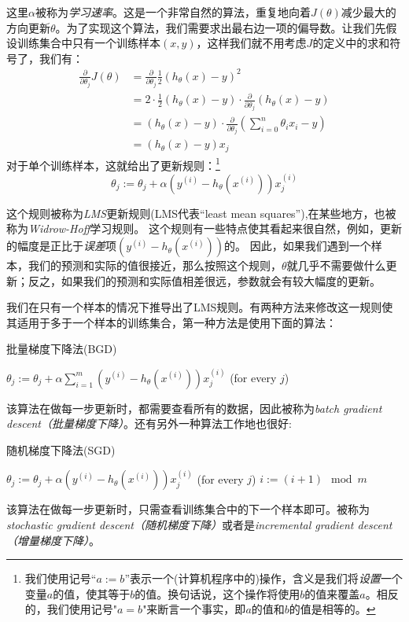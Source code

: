 这里$\alpha$被称为\emph{学习速率}。这是一个非常自然的算法，重复地向着$J(\theta)$减少最大的方向更新$\theta$。为了实现这个算法，我们需要求出最右边一项的偏导数。让我们先假设训练集合中只有一个训练样本$(x, y)$，这样我们就不用考虑$J$的定义中的求和符号了，我们有：
\begin{equation}
\begin{split}
\frac{\partial}{\partial\theta_j}J(\theta) &= \frac{\partial}{\partial\theta_j}\frac{1}{2}(h_\theta(x) - y)^2 \\
&= 2\cdot\frac{1}{2}(h_\theta(x) - y)\cdot\frac{\partial}{\partial\theta_j}(h_\theta(x) - y) \\
&= (h_\theta(x) - y)\cdot\frac{\partial}{\partial\theta_j}(\sum_{i = 0}^n\theta_ix_i - y) \\
&= (h_\theta(x) - y)x_j
\end{split}
\end{equation}
对于单个训练样本，这就给出了更新规则：\footnote{我们使用记号“$a := b$”表示一个(计算机程序中的)操作，含义是我们将\emph{设置}一个变量$a$的值，使其等于$b$的值。换句话说，这个操作将使用$b$的值来覆盖$a$。相反的，我们使用记号"$a = b$"来断言一个事实，即$a$的值和$b$的值是相等的。}
\begin{equation*}
\theta_j := \theta_j + \alpha(y^{(i)} - h_\theta(x^{(i)}))x^{(i)}_j
\end{equation*}

这个规则被称为\emph{LMS}更新规则(LMS代表``least mean squares''),在某些地方，也被称为\emph{Widrow-Hoff}学习规则。
这个规则有一些特点使其看起来很自然，例如，更新的幅度是正比于\emph{误差}项$(y^{(i)} - h_\theta(x^{(i)}))$的。
因此，如果我们遇到一个样本，我们的预测和实际的值很接近，那么按照这个规则，$\theta$就几乎不需要做什么更新；反之，如果我们的预测和实际值相差很远，参数就会有较大幅度的更新。

我们在只有一个样本的情况下推导出了LMS规则。有两种方法来修改这一规则使其适用于多于一个样本的训练集合，第一种方法是使用下面的算法：
\begin{algorithm}[H]
\caption{批量梯度下降法(BGD)}  
\begin{algorithmic}    
\REPEAT  
\STATE $\theta_j := \theta_j + \alpha\sum_{i = 1}^m(y^{(i)} - h_\theta(x^{(i)}))x^{(i)}_j$ (for every $j$)
\end{algorithmic}  
\end{algorithm}
该算法在做每一步更新时，都需要查看所有的数据，因此被称为\emph{batch gradient descent（批量梯度下降）}。还有另外一种算法工作地也很好:
\begin{algorithm}[H]
\caption{随机梯度下降法(SGD)}  
\begin{algorithmic}    
\REPEAT  
\STATE $\theta_j := \theta_j + \alpha(y^{(i)} - h_\theta(x^{(i)}))x^{(i)}_j$ (for every $j$)
\STATE $i := (i + 1) \mod m$
\end{algorithmic}  
\end{algorithm}
该算法在做每一步更新时，只需查看训练集合中的下一个样本即可。被称为\emph{stochastic gradient descent（随机梯度下降）}或者是\emph{incremental gradient descent（增量梯度下降）}。

